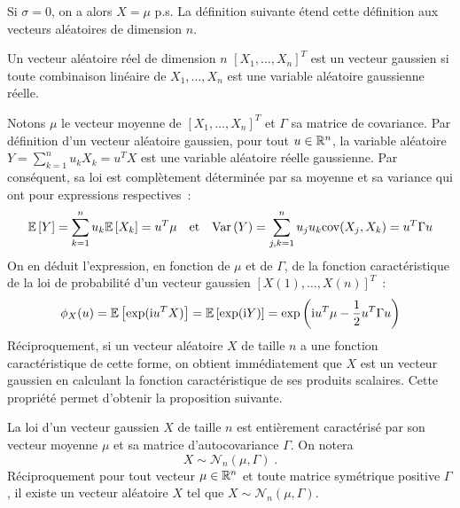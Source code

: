 Si $\sigma=0$, on a alors $X=\mu$ p.s.
La d\'efinition suivante \'etend cette
d\'efinition aux vecteurs al\'eatoires de dimension $n$.

\begin{definition}
  Un vecteur al\'eatoire r\'eel de dimension $n$
  $[X_1,\dots,X_n]^T$
  est un vecteur gaussien si toute combinaison
  lin\'eaire de $X_1,\dots,X_n$ est une variable al\'eatoire gaussienne
  r\'eelle.
\end{definition}
Notons $\mu$ le vecteur moyenne de $[X_1,\dots,X_n]^T$ et $\Gamma$ sa
matrice de covariance. Par d\'efinition d'un vecteur al\'eatoire gaussien,
pour tout $u\in\mathbb{R}^n$, la variable al\'eatoire $Y = \sum_{k=1}^n u_k
X_k=u^TX$ est une variable al\'eatoire r\'eelle gaussienne. Par
cons\'equent, sa loi est compl\`etement d\'etermin\'ee par sa moyenne et sa
variance qui ont pour expressions respectives~:
\[
 {\mathbb E}\left[  Y  \right]= \sum_{k=1}^n u_k {\mathbb E}\left[ X_k \right]=u^T\mu
 \quad \mbox {et} \quad
 \mathrm{Var}\left( Y \right)= \sum_{j,k=1}^n u_j u_k \mathrm{cov}(X_j,X_k)=u^T \Gamma u
\]
On en d\'eduit l'expression, en fonction de $\mu$ et de $\Gamma$, de
la fonction caract\'eristique de la loi de probabilit\'e d'un vecteur
gaussien $[X(1),\dots,X(n)]^T$~:
 \begin{equation}
 \label{eq:fcarac_vectgaussien}
 \phi_X(u)={\mathbb E}\left[  \exp( \mathrm{i} u^T X)  \right]={\mathbb E}\left[  \exp( \mathrm{i} Y)  \right]
 =
 \exp \left ( \mathrm{i} u^T \mu - \frac{1}{2}u^T \Gamma u
 \right)
\end{equation}
R\'eciproquement, si un vecteur al\'eatoire $X$ de taille $n$ a une fonction caract\'eristique de
cette forme, on obtient imm\'ediatement que $X$ est un vecteur gaussien en
calculant la fonction caract\'eristique de ses produits scalaires.
Cette propri\'et\'e permet d'obtenir la proposition suivante.
 \begin{proposition}\label{prop:vect_gaussiens}
   La loi d'un vecteur gaussien $X$ de taille $n$ est enti\`erement caract\'eris\'e par son vecteur
   moyenne $\mu$ et sa matrice d'autocovariance $\Gamma$. On notera
$$
X\sim\mathcal{N}_n( \mu, \Gamma) \;.
$$
R\'eciproquement pour tout vecteur
   $\mu\in\mathbb{R}^n$ et toute matrice sym\'etrique positive $\Gamma$, il existe un
   vecteur al\'eatoire $X$ tel que $X\sim\mathcal{N}_n( \mu, \Gamma)$.
 \end{proposition}
